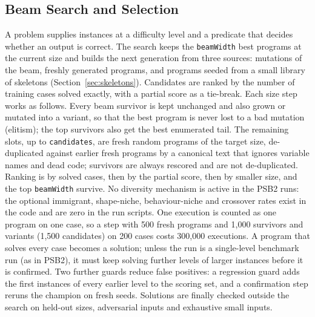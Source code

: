 \documentclass[sigconf,nonacm]{acmart}
\begin{document}
\subsection{Beam Search and Selection}
A problem supplies instances at a difficulty level and a predicate that decides whether an output is correct. The search keeps the
\texttt{beamWidth} best programs at the current size and builds the next generation from three sources: mutations of the beam,
freshly generated programs, and programs seeded from a small library of skeletons (Section~\ref{sec:skeletons}). Candidates are ranked by the
number of training cases solved exactly, with a partial score as a tie-break. Each size step works as follows. Every beam survivor is kept unchanged and also grown or mutated into a variant, so that the best program is never lost to a bad mutation (elitism); the top survivors also get the best enumerated tail. The remaining slots, up to \texttt{candidates}, are fresh random programs of the target size, de-duplicated against earlier fresh programs by a canonical text that ignores variable names and dead code; survivors are always rescored and are not de-duplicated. Ranking is by solved cases, then by the partial score, then by smaller size, and the top \texttt{beamWidth} survive. No diversity mechanism is active in the PSB2 runs: the optional immigrant, shape-niche, behaviour-niche and crossover rates exist in the code and are zero in the run scripts. One execution is counted as one program on one case, so a step with 500 fresh programs and 1,000 survivors and variants (1,500 candidates) on 200 cases costs 300,000 executions. A program that solves every case becomes a
solution; unless the run is a single-level benchmark run (as in PSB2), it must keep solving further levels of larger instances before it is
confirmed. Two further guards reduce false positives: a regression guard adds the first instances of every earlier level to the scoring set,
and a confirmation step reruns the champion on fresh seeds. Solutions are finally checked outside the search on held-out sizes, adversarial
inputs and exhaustive small inputs.
\end{document}
